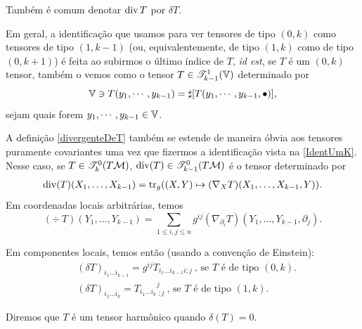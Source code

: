     \begin{oobs}\label{DeltaT}
      Também é comum denotar $\operatorname{div} T$ por $\delta T$.
      \end{oobs}

      \begin{oobs}\label{IdentUmK}
        Em geral, a identificação que usamos para ver tensores de tipo $(0, k)$ como tensores de tipo $(1, k-1)$ (ou, equivalentemente, de tipo $(1, k)$ como de tipo $(0,k+1)$) é feita ao subirmos o último índice de $T$, \emph{id est}, se $T$ é um $(0, k)$ tensor, também o vemos como o tensor $T \in \mathscr{T}^{1}_{k-1}(\mathbb{V})$ determinado por 
        \[
        \mathbb{V} \ni T(y_1, \cdots, y_{k-1}) = \sharp[T(y_1, \cdots, y_{k-1}, \bullet)],
        \]
        sejam quais forem $y_1, \cdots, y_{k-1} \in \mathbb{V}$.
        \end{oobs}

      \begin{oobs}
        A definição \cref{divergenteDeT} também se estende de maneira óbvia aos tensores puramente covariantes uma vez que fizermos a identificação vista na \cref{IdentUmK}. Nesse caso, se $T \in \mathscr{T}^0_k(T \mathcal{M})$, $\mathrm{div}(T) \in \mathscr{T}^{0}_{k-1}(T \mathcal{M})$ é o tensor determinado por
        \[ \begin{aligned}
        \mathrm{div}(T)(X_1, \ldots, X_{k-1}) &= \operatorname{tr}_g((X, Y) \mapsto (\nabla_X T)(X_1, \ldots, X_{k-1}, Y)). \\
        \end{aligned}
        \]
        Em coordenadas locais arbitrárias, temos
        \[
        (\div \ T)(Y_1, \ldots, Y_{k-1}) = \sum_{1 \leq i, j \leq n} g^{ij} (\nabla_{\partial_i} T)(Y_1, \ldots, Y_{k-1}, \partial_j) .
        \]
        \end{oobs}
        \begin{oobs}
        Em componentes locais, temos então (usando a convenção de Einstein):
        \[ \begin{aligned}
        &(\delta T)_{i_1 \ldots i_{k-1}} = g^{ij} T_{i_1 \ldots i_{k-1} i ; j} \ \text{, se $T$ é de tipo $(0, k)$.} \\
        &(\delta T)_{i_1 \ldots i_k} = T_{i_1 \ldots i_k}{}^{j}_{\ ;j} \ \text{, se $T$ é de tipo $(1, k)$.}
        \end{aligned}
        \]
        \end{oobs}
        \begin{deff}
        Diremos que $T$ é um tensor harmônico quando $\delta(T) = 0$.
        \end{deff}

